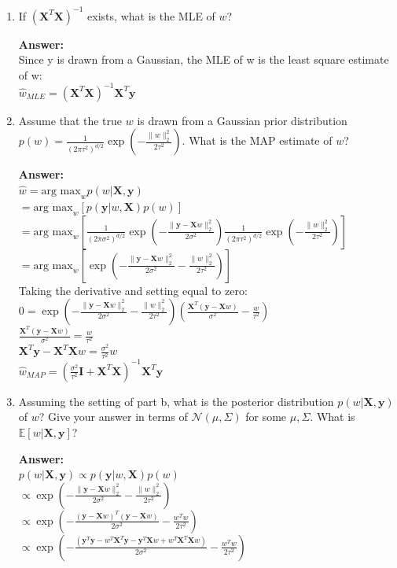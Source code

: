 \documentclass{article}
\newcommand{\mb}[1]{\mathbf{#1}}
\newcommand{\1}{\mathbf{1}}
\newcommand{\E}{\mathbb{E}} %
\begin{document}
\begin{enumerate}
  \item If $(\mb{X}^T \mb{X})^{-1}$ exists, what is the MLE of $w$?
  
  \textbf{Answer:}\\
  Since y is drawn from a Gaussian, the MLE of w is the least square estimate of w:\\
  $\widehat{w}_{MLE}= (\mb{X}^T \mb{X})^{-1}\mb{X}^T \mb{y}$
  
  \item Assume that the true $w$ is drawn from a Gaussian prior distribution $p(w) = \frac{1}{(2 \pi \tau^2)^{d/2}} \exp(-\frac{\|w\|_2^2}{2\tau^2})$. What is the MAP estimate of $w$?
  
  \textbf{Answer:}\\
  $\widehat{w}= \text{arg max}_w p(w | \mb{X,y})$\\
  $= \text{arg max}_w \left[p(\mb{y}|w,\mb{X})p(w) \right]$\\
  $= \text{arg max}_w \left[\frac{1}{(2\pi\sigma^2)^{d/2}} \exp(-\frac{\|\mb{y}-\mb{X} w\|_2^2}{2\sigma^2})\frac{1}{(2 \pi \tau^2)^{d/2}} \exp(-\frac{\|w\|_2^2}{2\tau^2}) \right]$\\
    $= \text{arg max}_w \left[ \exp(-\frac{\|\mb{y}-\mb{X} w\|_2^2}{2\sigma^2}-\frac{\|w\|_2^2}{2\tau^2}) \right]$\\
    Taking the derivative and setting equal to zero:\\
    $0=\exp(-\frac{\|\mb{y}-\mb{X} w\|_2^2}{2\sigma^2}-\frac{\|w\|_2^2}{2\tau^2}) (\frac{\mb{X}^T(\mb{y}- \mb{X}w)}{\sigma^2}-\frac{w}{\tau^2})$\\
    $\frac{\mb{X}^T(\mb{y}- \mb{X}w)}{\sigma^2}=\frac{w}{\tau^2}$\\
    $\mb{X}^T\mb{y}- \mb{X}^T\mb{X}w=\frac{\sigma^2}{\tau^2} w$\\
       $\widehat{w}_{MAP}=(\frac{\sigma^2}{\tau^2} \mb{I}+\mb{X}^T\mb{X})^{-1}\mb{X}^T\mb{y}$
  
  \item Assuming the setting of part b, what is the posterior distribution $p(w| \mb{X}, \mb{y})$ of $w$? Give your answer in terms of $\mathcal{N}(\mu,\Sigma)$ for some $\mu,\Sigma$. What is $\E[w | \mb{X}, \mb{y} ]$?
  
  \textbf{Answer:}\\
  $ p(w | \mb{X,y})\propto p(\mb{y}|w,\mb{X})p(w)$\\
  $\propto \exp(-\frac{\|\mb{y}-\mb{X} w\|_2^2}{2\sigma^2}-\frac{\|w\|_2^2}{2\tau^2})$\\
  $\propto \exp(-\frac{(\mb{y}-\mb{X} w)^T (\mb{y}-\mb{X} w)}{2\sigma^2}-\frac{w^T w}{2\tau^2})$\\    
  $\propto \exp(-\frac{(\mb{y}^T\mb{y}-w^T\mb{X}^T \mb{y}-\mb{y}^T\mb{X} w+w^T\mb{X}^T \mb{X} w)}{2\sigma^2}-\frac{w^T w}{2\tau^2})$\\  
  

\end{enumerate}
\end{document}

